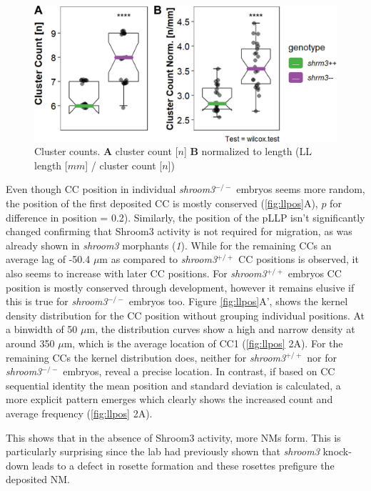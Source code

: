 \documentclass[10pt, b5paper, singlespacinge, twoside]{reedthesis} %
\theoremstyle{definition}
\theoremstyle{definition}
\theoremstyle{definition}
\theoremstyle{remark}
\begin{document}
\begin{figure}

{\centering \includegraphics[width=0.6\linewidth]{figures/results/01_morphometrics/ll_counts} 

}

\caption[Cluster Counts]{Cluster counts. \textbf{A} cluster count {[}\(n\){]} \textbf{B} normalized to length (LL length {[}\(mm\){]} / cluster count {[}\(n\){]})}\label{fig:llcounts}
\end{figure}
Even though CC position in individual \emph{shroom3}\(^{-/-}\) embryos seems more random, the position of the first deposited CC is mostly conserved (\ref{fig:llpos}A), \(p\) for difference in position = 0.2). Similarly, the position of the pLLP isn't significantly changed confirming that Shroom3 activity is not required for migration, as was already shown in \emph{shroom3} morphants (\emph{1}). While for the remaining CCs an average lag of -50.4 \(\mu\)m as compared to \emph{shroom3}\(^{+/+}\) CC positions is observed, it also seems to increase with later CC positions. For \emph{shroom3}\(^{+/+}\) embryos CC position is mostly conserved through development, however it remains elusive if this is true for \emph{shroom3}\(^{-/-}\) embryos too.
Figure \ref{fig:llpos}A', shows the kernel density distribution for the CC position without grouping individual positions. At a binwidth of 50 \(\mu\)m, the distribution curves show a high and narrow density at around 350 \(\mu\)m, which is the average location of CC1 (\ref{fig:llpos} 2A). For the remaining CCs the kernel distribution does, neither for \emph{shroom3}\(^{+/+}\) nor for \emph{shroom3}\(^{-/-}\) embryos, reveal a precise location. In contrast, if based on CC sequential identity the mean position and standard deviation is calculated, a more explicit pattern emerges which clearly shows the increased count and average frequency (\ref{fig:llpos} 2A).

This shows that in the absence of Shroom3 activity, more NMs form. This is particularly surprising since the lab had previously shown that \emph{shroom3} knock-down leads to a defect in rosette formation and these rosettes prefigure the deposited NM.
\end{document}
